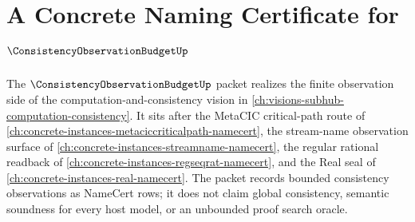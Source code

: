 \chapter{A Concrete Naming Certificate for $\ConsistencyObservationBudgetUp$}
\label{ch:concrete-instances-consistency-observation-budget-namecert}

The $\ConsistencyObservationBudgetUp$ packet realizes the finite observation side of the computation-and-consistency vision in \autoref{ch:visions-subhub-computation-consistency}. It sits after the MetaCIC critical-path route of \autoref{ch:concrete-instances-metaciccriticalpath-namecert}, the stream-name observation surface of \autoref{ch:concrete-instances-streamname-namecert}, the regular rational readback of \autoref{ch:concrete-instances-regseqrat-namecert}, and the Real seal of \autoref{ch:concrete-instances-real-namecert}. The packet records bounded consistency observations as NameCert rows; it does not claim global consistency, semantic soundness for every host model, or an unbounded proof search oracle.

